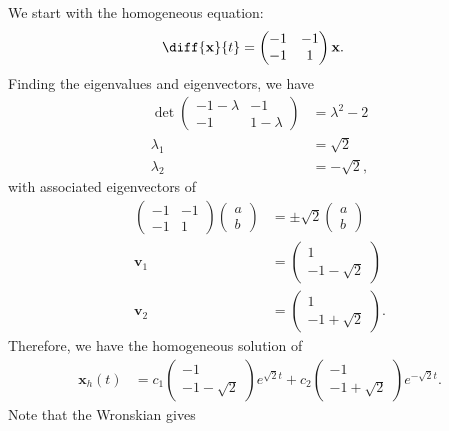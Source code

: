 \documentclass[10pt]{mypackage}
\begin{document}
\begin{solution}[8.1, Problem 26]
  We start with the homogeneous equation:
  \begin{align*}
    \diff{\mathbf{x}}{t} &= \begin{pmatrix}-1 & -1 \\ -1 & 1\end{pmatrix} \mathbf{x}.
  \end{align*}
  Finding the eigenvalues and eigenvectors, we have
  \begin{align*}
    \det \begin{pmatrix}-1-\lambda & -1 \\ -1 & 1-\lambda\end{pmatrix} &= \lambda^2 - 2\\
    \lambda_1 &= \sqrt{2}\\
    \lambda_2 &= -\sqrt{2},
  \end{align*}
  with associated eigenvectors of
  \begin{align*}
    \begin{pmatrix}-1 & -1 \\ -1 & 1\end{pmatrix} \begin{pmatrix}a\\b\end{pmatrix} &= \pm\sqrt{2} \begin{pmatrix}a\\b\end{pmatrix}\\
    \mathbf{v}_1 &= \begin{pmatrix}1\\-1-\sqrt{2}\end{pmatrix} \\
    \mathbf{v}_2 &= \begin{pmatrix}1\\-1+\sqrt{2}\end{pmatrix}.
  \end{align*}
  Therefore, we have the homogeneous solution of
  \begin{align*}
    \mathbf{x}_h(t) &= c_1\begin{pmatrix}-1\\-1-\sqrt{2}\end{pmatrix}e^{\sqrt{2} t} + c_2 \begin{pmatrix}-1\\-1+\sqrt{2}\end{pmatrix} e^{-\sqrt{2}t}.
  \end{align*}
  Note that the Wronskian gives

\end{solution}
\end{document}
